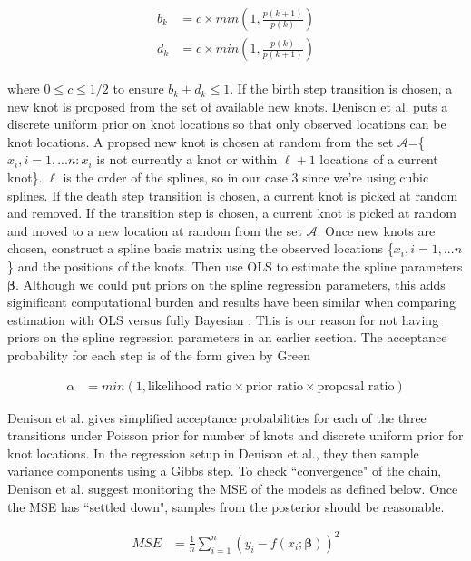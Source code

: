 \documentclass[11pt]{article}\usepackage[]{graphicx}\usepackage[]{color}
\begin{document}
\begin{align}
\begin{split}
\label{knotproposal}
b_k &= c \times min\left(1, \frac{p(k+1)}{p(k)} \right) \\
d_k &= c \times min\left(1, \frac{p(k)}{p(k+1)} \right) 
\end{split}
\end{align}

where $0\leq c \leq 1/2$ to ensure $b_k+d_k \leq 1$. If the birth step transition is chosen, a new knot is proposed from the set of available new knots. Denison et al. puts a discrete uniform prior on knot locations so that only observed locations can be knot locations.  A propsed new knot is chosen at random from the set $\mathcal{A}$=\{$x_i,i=1,...n:x_i$ is not currently a knot or within $\ell+1$ locations of a current knot\}. $\ell$ is the order of the splines, so in our case 3 since we're using cubic splines. If the death step transition is chosen, a current knot is picked at random and removed. If the transition step is chosen, a current knot is picked at random and moved to a new location at random from the set $\mathcal{A}$. Once new knots are chosen, construct a spline basis matrix using the observed locations \{$x_i,i=1,...n$\} and the positions of the knots. Then use OLS to estimate the spline parameters $\boldsymbol{\beta}$. Although we could put priors on the spline regression parameters, this adds siginificant computational burden and results have been similar when comparing estimation with OLS versus fully Bayesian \cite{denison}. This is our reason for not having priors on the spline regression parameters in an earlier section. The acceptance probability for each step is of the form given by Green

\begin{align}
\alpha &= min(1, \text{likelihood ratio} \times \text{prior ratio} \times \text{proposal ratio})
\end{align}

Denison et al. gives simplified acceptance probabilities for each of the three transitions under Poisson prior for number of knots and discrete uniform prior for knot locations. In the regression setup in Denison et al., they then sample variance components using a Gibbs step. To check ``convergence" of the chain, Denison et al. suggest monitoring the MSE of the models as defined below. Once the MSE has ``settled down", samples from the posterior should be reasonable.

\begin{align}
MSE &= \frac{1}{n} \sum_{i=1}^{n}(y_i - f(x_i;\boldsymbol{\beta}))^2
\end{align}
\end{document}
